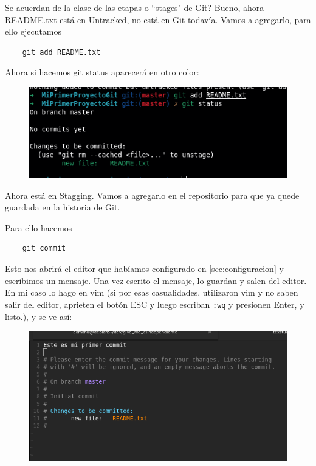 \documentclass[a4paper]{article}
\begin{document}
Se acuerdan de la clase de las etapas o ``stages" de Git? Bueno, ahora README.txt
está en Untracked, no está en Git todavía. Vamos a agregarlo, para ello ejecutamos

\begin{verbatim}
	git add README.txt
\end{verbatim}

Ahora si hacemos git status aparecerá en otro color:

\begin{figure}[H]
	\centering
	\includegraphics[width=0.7\linewidth]{img/miprimerproyecto5}
	\label{fig:miprimerproyecto5}
\end{figure}

Ahora está en Stagging. Vamos a agregarlo en el repositorio para que ya quede
guardada en la historia de Git.

Para ello hacemos 

\begin{verbatim}
	git commit
\end{verbatim}

Esto nos abrirá el editor que habíamos configurado en \ref{sec:configuracion} y 
escribimos un mensaje. Una vez escrito el mensaje, lo guardan y salen del editor.
En mi caso lo hago en vim (si por esas casualidades, utilizaron vim y no saben
salir del editor, aprieten el botón ESC y luego escriban \verb|:wq| y presionen
Enter, y listo.), y se ve así:

\begin{figure}[H]
	\centering
	\includegraphics[width=0.7\linewidth]{img/miprimerproyecto6}
	\label{fig:miprimerproyecto6}
\end{figure}
\end{document}
